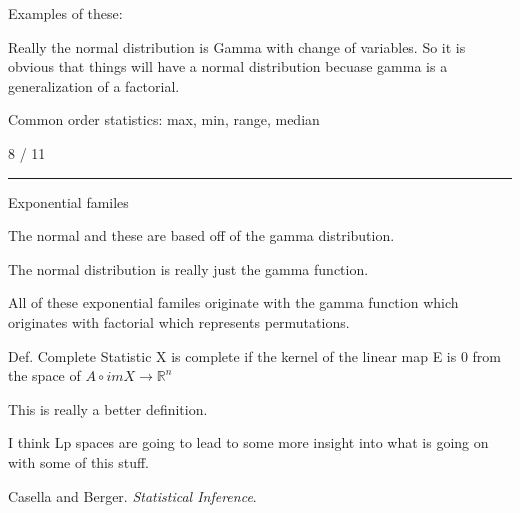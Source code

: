 \documentclass[12pt, reqno]{amsart}
\numberwithin{equation}{section}
\newcommand{\R}{\mathbb{R}}
\begin{document}
Examples of these:

Really the normal distribution is Gamma with change of variables. So it is obvious that things will have a normal distribution becuase gamma is a generalization of a factorial.

Common order statistics:
max, min, range, median

8 / 11
\rule{\textwidth}{.5pt}

Exponential familes

The normal and these are based off of the gamma distribution.

The normal distribution is really just the gamma function.

All of these exponential familes originate with the gamma function which originates with factorial which represents permutations.

Def. Complete Statistic
X is complete if the kernel of the linear map E is 0 from the space of $A \circ imX \to \R^n$

This is really a better definition.

I think Lp spaces are going to lead to some more insight into what is going on with some of this stuff.

\begin{thebibliography}{1}

Casella and Berger. \textit{Statistical Inference}.
\end{thebibliography}
\end{document}
